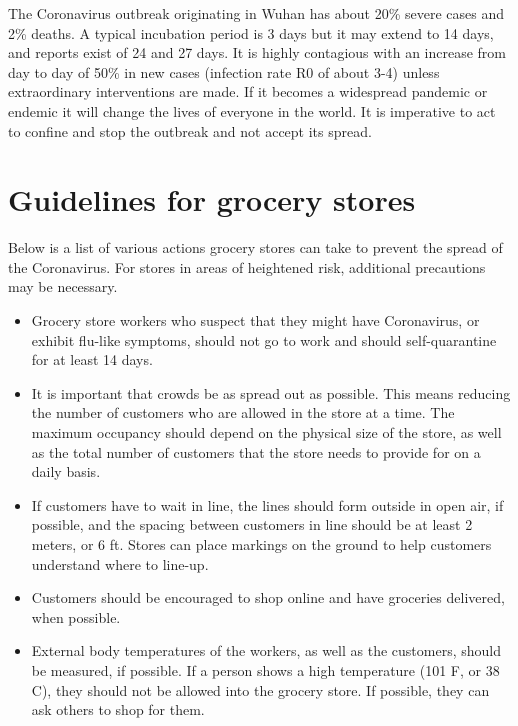\documentclass[onecolumn,journal]{IEEEtran}
\begin{document}
\begin{multicols}{2}
The Coronavirus outbreak originating in Wuhan has about 20\% severe cases and 2\% deaths. A typical incubation period is 3 days but it may extend to 14 days, and reports exist of 24 and 27 days. It is highly contagious with an increase from day to day of 50\% in new cases (infection rate R0 of about 3-4) unless extraordinary interventions are made. If it becomes a widespread pandemic or endemic it will change the lives of everyone in the world. It is imperative to act to confine and stop the outbreak and not accept its spread.

\section*{Guidelines for grocery stores}

Below is a list of various actions grocery stores can take to prevent the spread of the Coronavirus. For stores in areas of heightened risk, additional precautions may be necessary.

\begin{itemize}
    \item Grocery store workers who suspect that they might have Coronavirus, or exhibit flu-like symptoms, should not go to work and should self-quarantine for at least 14 days.
    
    \item It is important that crowds be as spread out as possible. This means reducing the number of customers who are allowed in the store at a time. The maximum occupancy should depend on the physical size of the store, as well as the total number of customers that the store needs to provide for on a daily basis.
    
    \item If customers have to wait in line, the lines should form outside in open air, if possible, and the spacing between customers in line should be at least 2 meters, or 6 ft. Stores can place markings on the ground to help customers understand where to line-up.
    
    \item Customers should be encouraged to shop online and have groceries delivered, when possible.
    
    \item External body temperatures of the workers, as well as the customers, should be measured, if possible. If a person shows a high temperature (101 F, or 38 C), they should not be allowed into the grocery store. If possible, they can ask others to shop for them.
    

\end{itemize}
\end{multicols}
\end{document}
